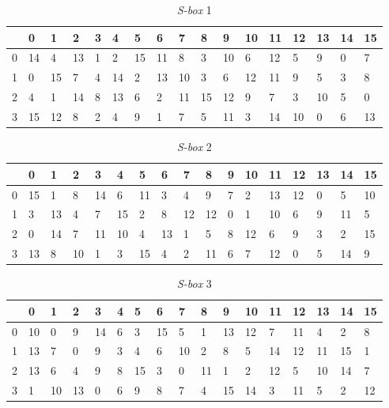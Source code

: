 \begin{table}[H]
	\caption{\textit{S-box} 1}\label{table:s_box1}
	\begin{center}
		\begin{tabular}{|l|l|l|l|l|l|l|l|l|l|l|l|l|l|l|l|l|}
				\hline
				& 0 & 1	& 2 & 3 & 4 & 5 & 6 & 7 & 8 & 9 & 10 & 11 & 12 & 13 & 14 & 15	\\ \hline
			0 & 14 & 4 & 13 & 1 & 2 & 15 & 11 & 8 & 3 & 10 & 6 & 12 & 5 & 9 & 0 & 7	\\ \hline
			1 & 0 & 15 & 7 & 4 & 14 & 2 & 13 & 10 & 3 & 6 & 12 & 11 & 9 & 5 & 3 & 8	\\ \hline
			2 & 4 & 1 & 14 & 8 & 13 & 6 & 2 & 11 & 15 & 12 & 9 & 7 & 3 & 10 & 5 & 0	\\ \hline
			3 & 15 & 12 & 8 & 2 & 4 & 9 & 1 & 7 & 5 & 11 & 3 & 14 & 10 & 0 & 6 & 13	\\ \hline
		\end{tabular}
	\end{center}
\end{table}

\begin{table}[H]
	\caption{\textit{S-box} 2}\label{table:s_box2}
	\begin{center}
		\begin{tabular}{|l|l|l|l|l|l|l|l|l|l|l|l|l|l|l|l|l|}
				\hline
				& 0 & 1	& 2 & 3 & 4 & 5 & 6 & 7 & 8 & 9 & 10 & 11 & 12 & 13 & 14 & 15	\\ \hline
			0 & 15 & 1 & 8 & 14 & 6 & 11 & 3 & 4 & 9 & 7 & 2 & 13 & 12 & 0 & 5 & 10	\\ \hline
			1 & 3 & 13 & 4 & 7 & 15 & 2 & 8 & 12 & 12 & 0 & 1 & 10 & 6 & 9 & 11 & 5	\\ \hline
			2 & 0 & 14 & 7 & 11 & 10 & 4 & 13 & 1 & 5 & 8 & 12 & 6 & 9 & 3 & 2 & 15	\\ \hline
			3 & 13 & 8 & 10 & 1 & 3 & 15 & 4 & 2 & 11 & 6 & 7 & 12 & 0 & 5 & 14 & 9	\\ \hline
		\end{tabular}
	\end{center}
\end{table}

\begin{table}[H]
	\caption{\textit{S-box} 3}\label{table:s_box3}
	\begin{center}
		\begin{tabular}{|l|l|l|l|l|l|l|l|l|l|l|l|l|l|l|l|l|}
				\hline
				& 0 & 1	& 2 & 3 & 4 & 5 & 6 & 7 & 8 & 9 & 10 & 11 & 12 & 13 & 14 & 15	\\ \hline
			0 & 10 & 0 & 9 & 14 & 6 & 3 & 15 & 5 & 1 & 13 & 12 & 7 & 11 & 4 & 2 & 8	\\ \hline
			1 & 13 & 7 & 0 & 9 & 3 & 4 & 6 & 10 & 2 & 8 & 5 & 14 & 12 & 11 & 15 & 1	\\ \hline
			2 & 13 & 6 & 4 & 9 & 8 & 15 & 3 & 0 & 11 & 1 & 2 & 12 & 5 & 10 & 14 & 7	\\ \hline
			3 & 1 & 10 & 13 & 0 & 6 & 9 & 8 & 7 & 4 & 15 & 14 & 3 & 11 & 5 & 2 & 12	\\ \hline
		\end{tabular}
	\end{center}
\end{table}

